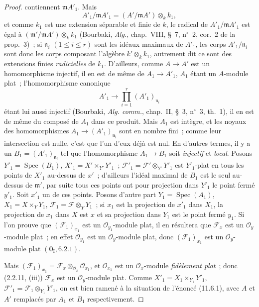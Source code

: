\begin{proof}
contiennent $\mathfrak m A'_1$. Mais
\[
A'_1/\mathfrak m A'_1=(A'/\mathfrak m A')\otimes_k k_1,
\]
et comme $k_1$ est une extension séparable et finie de $k$, le radical de
$A'_1/\mathfrak m A'_1$ est égal à
$(\mathfrak m'/\mathfrak m A')\otimes_k k_1$ (Bourbaki, \emph{Alg.},
chap.~VIII, \S~7, n$^\circ$~2, cor.~2 de la prop.~3)~; si $\mathfrak n_i$
$(1\leq i\leq r)$ sont les idéaux maximaux de $A'_1$, les corps
$A'_1/\mathfrak n_i$ sont donc les corps composant l'algèbre
$k'\otimes_k k_1$, autrement dit ce sont des extensions finies
\emph{radicielles} de $k_1$. D'ailleurs, comme $A\to A'$ est un homomorphisme
injectif, il en est de même de $A_1\to A'_1$, $A_1$ étant un $A$-module plat~;
l'homomorphisme canonique
\[
A'_1\longrightarrow\prod_{i=1}^{r}(A'_1)_{\mathfrak n_i}
\]
étant lui aussi injectif (Bourbaki, \emph{Alg. comm.}, chap.~II, \S~3,
n$^\circ$~3, th.~1), il en est de même du composé de $A_1$ dans ce produit.
Mais $A_1$ est intègre, et les noyaux des homomorphismes
$A_1\to(A'_1)_{\mathfrak n_i}$ sont en nombre fini~; comme leur intersection
est nulle, c'est que l'un d'eux déjà est nul. En d'autres termes, il y a un
$B_1=(A'_1)_{\mathfrak n_i}$ tel que l'homomorphisme $A_1\to B_1$ soit
\emph{injectif} et \emph{local}. Posons $Y'_1=\operatorname{Spec}(B_1)$,
$X'_1=X'\times_{Y'}Y'_1$~; $\mathcal F'_1=\mathcal F'\otimes_{Y'}Y'_1$ est
$Y'_1$-plat en tous les points de $X'_1$ au-dessus de $x'$~; d'ailleurs l'idéal
maximal de $B_1$ est le seul au-dessus de $\mathfrak m'$, par suite tous ces
points ont pour projection dans $Y'_1$ le point fermé $y'_1$. Soit $x'_1$ un de
ces points. Posons d'autre part $Y_1=\operatorname{Spec}(A_1)$,
$X_1=X\times_Y Y_1$, $\mathcal F_1=\mathcal F\otimes_Y Y_1$~; si $x_1$ est la
projection de $x'_1$ dans $X_1$, la projection de $x_1$ dans $X$ est $x$ et sa
projection dans $Y_1$ est le point fermé $y_1$. Si l'on prouve que
$(\mathcal F_1)_{x_1}$ est un $\mathcal O_{y_1}$-module plat, il en résultera
que $\mathcal F_x$ est un $\mathcal O_y$-module plat~; en effet
$\mathcal O_{y_1}$ est un $\mathcal O_y$-module plat, donc
$(\mathcal F_1)_{x_1}$ est un $\mathcal O_y$-module plat
$(\mathbf 0_{\mathrm I},6.2.1)$.


Mais $(\mathcal F_1)_{x_1}=\mathcal F_x\otimes_{\mathcal O_x}\mathcal O_{x_1}$,
et $\mathcal O_{x_1}$ est un $\mathcal O_x$-module \emph{fidèlement plat}~;
donc (2.2.11, (iii)) $\mathcal F_x$ est un $\mathcal O_y$-module plat. Comme
$X'_1=X_1\times_{Y_1}Y'_1$, $\mathcal F'_1=\mathcal F_1\otimes_{Y_1}Y'_1$,
on est bien ramené à la situation de l'énoncé (11.6.1), avec $A$ et $A'$
remplacés par $A_1$ et $B_1$ respectivement.


\end{proof}
